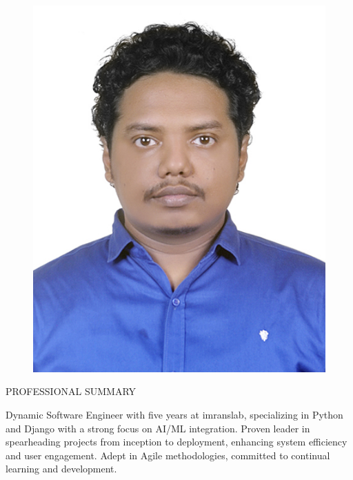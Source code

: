 \documentclass{resume} %
\begin{document}

\begin{figure}[t]
\includegraphics{jaman-01}
\centering
\end{figure}


\begin{rSection}{PROFESSIONAL SUMMARY}

{Dynamic Software Engineer with five years at imranslab, specializing in Python and Django with a strong focus on AI/ML integration. Proven leader in spearheading projects from inception to deployment, enhancing system efficiency and user engagement. Adept in Agile methodologies, committed to continual learning and development.}

\end{rSection}
\end{document}
